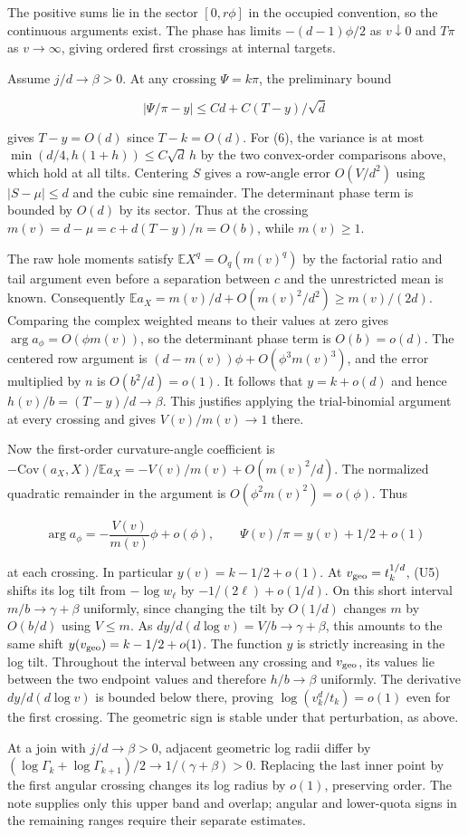 The positive sums lie in the sector $[0,r\phi]$ in the occupied convention, so the continuous arguments exist. The phase has limits $-(d-1)\phi/2$ as $v\downarrow0$ and $T\pi$ as $v\to\infty$, giving ordered first crossings at internal targets.

Assume $j/d\to\beta>0$. At any crossing $\Psi=k\pi$, the preliminary bound

\begin{equation}
|\Psi/\pi-y|\le C d+C(T-y)/\sqrt d
\tag{U6}
\end{equation}

gives $T-y=O(d)$ since $T-k=O(d)$. For (6), the variance is at most $\min(d/4,h(1+h))\le C\sqrt d\,h$ by the two convex-order comparisons above, which hold at all tilts. Centering $S$ gives a row-angle error $O(V/d^2)$ using $|S-\mu|\le d$ and the cubic sine remainder. The determinant phase term is bounded by $O(d)$ by its sector. Thus at the crossing $m(v)=d-\mu=c+d(T-y)/n=O(b)$, while $m(v)\ge1$.

The raw hole moments satisfy $\mathbb E X^q=O_q(m(v)^q)$ by the factorial ratio and tail argument even before a separation between $c$ and the unrestricted mean is known. Consequently $\mathbb E a_X=m(v)/d+O(m(v)^2/d^2)\ge m(v)/(2d)$. Comparing the complex weighted means to their values at zero gives $\arg a_\phi=O(\phi m(v))$, so the determinant phase term is $O(b)=o(d)$. The centered row argument is $(d-m(v))\phi+O(\phi^3 m(v)^3)$, and the error multiplied by $n$ is $O(b^2/d)=o(1)$. It follows that $y=k+o(d)$ and hence $h(v)/b=(T-y)/d\to\beta$. This justifies applying the trial-binomial argument at every crossing and gives $V(v)/m(v)\to1$ there.

Now the first-order curvature-angle coefficient is $-\mathrm{Cov}(a_X,X)/\mathbb E a_X=-V(v)/m(v)+O(m(v)^2/d)$. The normalized quadratic remainder in the argument is $O(\phi^2m(v)^2)=o(\phi)$. Thus

\begin{equation*}
\arg a_\phi=-\frac{V(v)}{m(v)}\phi+o(\phi),
\qquad
\Psi(v)/\pi=y(v)+1/2+o(1)
\end{equation*}

at each crossing. In particular $y(v)=k-1/2+o(1)$. At $v_{\rm geo}=t_k^{1/d}$, (U5) shifts its log tilt from $-\log w_\ell$ by $-1/(2\ell)+o(1/d)$. On this short interval $m/b\to\gamma+\beta$ uniformly, since changing the tilt by $O(1/d)$ changes $m$ by $O(b/d)$ using $V\le m$. As $dy/d(d\log v)=V/b\to\gamma+\beta$, this amounts to the same shift $y(v_{\rm geo})=k-1/2+o(1)$. The function $y$ is strictly increasing in the log tilt. Throughout the interval between any crossing and $v_{\rm geo}$, its values lie between the two endpoint values and therefore $h/b\to\beta$ uniformly. The derivative $dy/d(d\log v)$ is bounded below there, proving $\log(v_k^d/t_k)=o(1)$ even for the first crossing. The geometric sign is stable under that perturbation, as above.

At a join with $j/d\to\beta>0$, adjacent geometric log radii differ by $(\log\Gamma_k+\log\Gamma_{k+1})/2\to1/(\gamma+\beta)>0$. Replacing the last inner point by the first angular crossing changes its log radius by $o(1)$, preserving order. The note supplies only this upper band and overlap; angular and lower-quota signs in the remaining ranges require their separate estimates.
